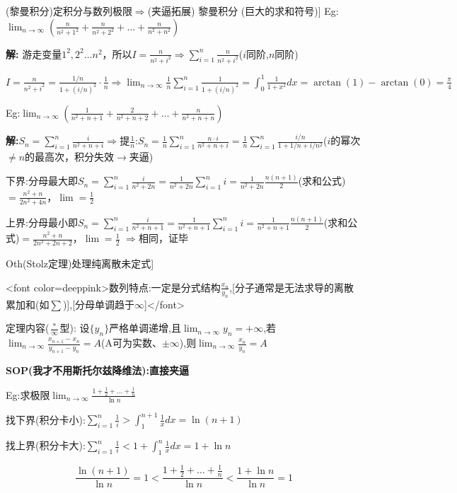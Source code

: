 \documentclass[11pt,a4paper,UTF8]{ctexart}
\begin{document}
\begin{thmbox}[[7](黎曼积分)定积分与数列极限$\Rightarrow$(夹逼拓展) 黎曼积分 (巨大的求和符号)]
\textit{}Eg:$\lim_{n \to \infty} (\frac{n}{n^2+1^2} + \frac{n}{n^2+2^2} + \dots + \frac{n}{n^2+n^2})$\textit{}

\textbf{解:} 游走变量$1^2, 2^2 \dots n^2$，所以$I = \frac{n}{n^2+i^2} \Rightarrow \sum_{i=1}^n \frac{n}{n^2+i^2}$($i$同阶,$n$同阶)

$I = \frac{n}{n^2+i^2} = \frac{1/n}{1+(i/n)^2} \cdot \frac{1}{n} \Rightarrow \lim_{n \to \infty} \frac{1}{n} \sum_{i=1}^n \frac{1}{1+(i/n)^2} = \int_0^1 \frac{1}{1+x^2} dx = \arctan(1) - \arctan(0) = \frac{\pi}{4}$

\textit{}Eg:$\lim_{n \to \infty} (\frac{1}{n^2+n+1} + \frac{2}{n^2+n+2} + \dots + \frac{n}{n^2+n+n})$\textit{}

\textbf{解:}$S_n = \sum_{i=1}^n \frac{i}{n^2+n+i} \Rightarrow$提$\frac{1}{n}$:$S_n = \frac{1}{n} \sum_{i=1}^n \frac{n \cdot i}{n^2+n+i} = \frac{1}{n} \sum_{i=1}^n \frac{i/n}{1+1/n+i/n^2}$($i$的幂次$\neq n$的最高次，积分失效$\to$夹逼)

下界:分母最大即$S_n = \sum_{i=1}^n \frac{i}{n^2+2n} = \frac{1}{n^2+2n} \sum_{i=1}^n i = \frac{1}{n^2+2n} \frac{n(n+1)}{2}$(求和公式)$= \frac{n^2+n}{2n^2+4n}$，$\lim = \frac{1}{2}$

上界:分母最小即$S_n = \sum_{i=1}^n \frac{i}{n^2+n+1} = \frac{1}{n^2+n+1} \sum_{i=1}^n i = \frac{1}{n^2+n+1} \frac{n(n+1)}{2}$(求和公式)$= \frac{n^2+n}{2n^2+2n+2}$，$\lim = \frac{1}{2}$
$\Rightarrow$相同，证毕

\end{thmbox}
\begin{thmbox}[[8]Oth(Stolz定理)处理纯离散未定式]

\textit{}<font color=deeppink>数列特点:一定是分式结构$\frac{x_n}{y_n}$,[分子通常是无法求导的离散累加和(如$\sum$)],[分母单调趋于$\infty$]</font>\textit{}

\textit{}定理内容($\frac{*}{\infty}$型):\textit{} 设$\{y_n\}$严格单调递增,且$\lim_{n \to \infty} y_n = +\infty$,若$\lim_{n \to \infty} \frac{x_{n+1}-x_n}{y_{n+1}-y_n} = A$(A可为实数、$\pm\infty$),则$\lim_{n \to \infty} \frac{x_n}{y_n} = A$

\textbf{SOP(我才不用斯托尔兹降维法):直接夹逼}

Eg:求极限$\lim_{n \to \infty} \frac{1 + \frac{1}{2} + \dots + \frac{1}{n}}{\ln n}$

找下界(积分卡小):$\sum_{i=1}^n \frac{1}{i} > \int_1^{n+1} \frac{1}{x} dx = \ln(n+1)$

找上界(积分卡大):$\sum_{i=1}^n \frac{1}{i} < 1 + \int_1^n \frac{1}{x} dx = 1 + \ln n$


\begin{equation*}
\frac{\ln(n+1)}{\ln n}=1 < \frac{1 + \frac{1}{2} + \dots + \frac{1}{n}}{\ln n} < \frac{1 + \ln n}{\ln n}=1
\end{equation*}

\end{thmbox}
\end{document}
